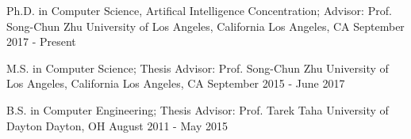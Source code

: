 


\begin{cventries}


\cventry
{Ph.D. in Computer Science, Artifical Intelligence Concentration; Advisor: Prof. Song-Chun Zhu}
{University of Los Angeles, California} %
{Los Angeles, CA} %
{September 2017 - Present} %
{ %
}
\vspace{-3mm}


\cventry
{M.S. in Computer Science; Thesis Advisor: Prof. Song-Chun Zhu}
{University of Los Angeles, California} %
{Los Angeles, CA} %
{September 2015 - June 2017} %
{ %
}
\vspace{-3mm}


\cventry
{B.S. in Computer Engineering; Thesis Advisor: Prof. Tarek Taha}
{University of Dayton} %
{Dayton, OH} %
{August 2011 - May 2015} %
{ %
}
\vspace{-5.5mm}


\end{cventries}